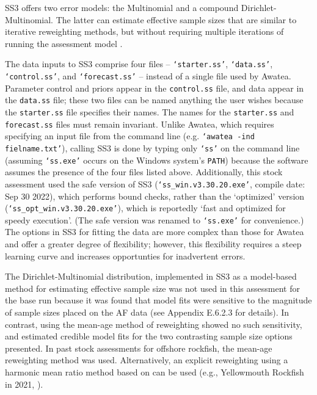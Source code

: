 \documentclass[11pt]{book}
\newcommand{\code}[1]{\normalsize\texttt{#1}\normalsize}%
\begin{document}
SS3 offers two error models: the Multinomial and a compound Dirichlet-Multinomial.
The latter can estimate effective sample sizes that are similar to iterative reweighting methods, but without requiring multiple iterations of running the assessment model \citep{Thorson-etal:2017}.

The data inputs to SS3 comprise four files -- \code{`starter.ss'}, \code{`data.ss'}, \code{`control.ss'}, and \code{`forecast.ss'} -- instead of a single file used by Awatea.
Parameter control and priors appear in the \code{control.ss} file, and data appear in the \code{data.ss} file; these two files can be named anything the user wishes because the \code{starter.ss} file specifies their names.
The names for the \code{starter.ss} and \code{forecast.ss} files must remain invariant.
Unlike Awatea, which requires specifying an input file from the command line (e.g. \code{`awatea -ind fielname.txt'}), calling SS3 is done by typing only \code{`ss'} on the command line (assuming \code{`ss.exe'} occurs on the Windows system's \code{PATH}) because the software assumes the presence of the four files listed above.
Additionally, this stock assessment used the safe version of SS3 (\code{`ss\_win.v3.30.20.exe'}, compile date: Sep 30 2022), which performs bound checks, rather than the `optimized' version (\code{`ss\_opt\_win.v3.30.20.exe'}), which is reportedly `fast and optimized for speedy execution'.
(The safe version was renamed to \code{`ss.exe'} for convenience.)
The options in SS3 for fitting the data are more complex than those for Awatea and offer a greater degree of flexibility; however, this flexibility requires a steep learning curve and increases opportunties for inadvertent errors.

The Dirichlet-Multinomial distribution, implemented in SS3 as a model-based method for estimating effective sample size \citep{Thorson-etal:2017} was not used in this assessment for the base run because it was found that model fits were sensitive to the magnitude of sample sizes placed on the AF data (see Appendix E.6.2.3 for details).
In contrast, using the \citet{Francis:2011} mean-age method of reweighting showed no such sensitivity, and estimated credible model fits for the two contrasting sample size options presented.
In past stock assessments for offshore rockfish, the \citet{Francis:2011} mean-age reweighting method was used.
Alternatively, an explicit reweighting using a harmonic mean ratio method based on \citet{McAllister-Ianelli:1997} can be used (e.g., Yellowmouth Rockfish in 2021, \citealt{Starr-Haigh:2022_ymr}).
\end{document}
